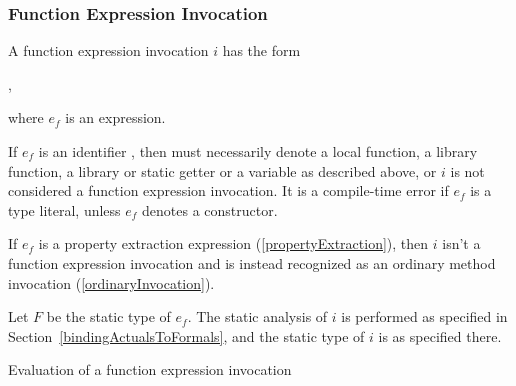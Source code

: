 \documentclass[makeidx]{article}
\begin{document}
\subsubsection{Function Expression Invocation}

\LMHash{}%
A function expression invocation $i$ has the form

,

\noindent
where $e_f$ is an expression.


\LMHash{}%
If $e_f$ is an identifier \id, then \id{} must necessarily denote
a local function, a library function, a library or static getter or a variable as described above,
or $i$ is not considered a function expression invocation.
It is a compile-time error if $e_f$ is a type literal,
unless $e_f$ denotes a constructor.


\LMHash{}%
If $e_f$ is a property extraction expression (\ref{propertyExtraction}),
then $i$ isn't a function expression invocation and is instead recognized as an ordinary method invocation (\ref{ordinaryInvocation}).


\LMHash{}%
Let $F$ be the static type of $e_f$.
The static analysis of $i$ is performed as specified in Section~\ref{bindingActualsToFormals},
and the static type of $i$ is as specified there.

\LMHash{}%
Evaluation of a function expression invocation

\end{document}

